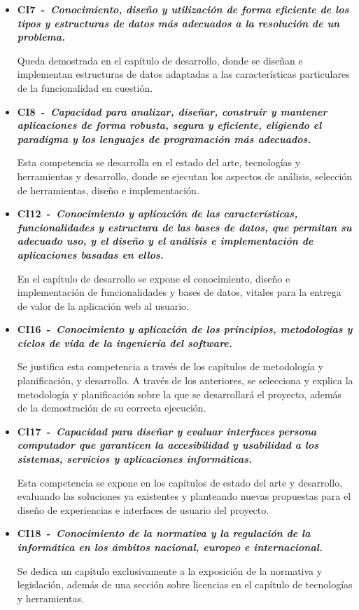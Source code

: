 \begin{itemize}
    Se cubre esta competencia en el capítulo de desarrollo, específicamente en la construcción de un algoritmo que permite el cálculo de acordes.

    \item \textbf{CI7~-~\emph{Conocimiento, diseño y utilización de forma eficiente de los tipos y estructuras de datos más adecuados a la resolución de un problema.}}

    Queda demostrada en el capítulo de desarrollo, donde se diseñan e implementan estructuras de datos adaptadas a las características particulares de la funcionalidad en cuestión.

    \item \textbf{CI8~-~\emph{Capacidad para analizar, diseñar, construir y mantener aplicaciones de forma robusta, segura y eficiente, eligiendo el paradigma y los lenguajes de programación más adecuados.}}

    Esta competencia se desarrolla en el estado del arte, tecnologías y herramientas y desarrollo, donde se ejecutan los aspectos de análisis, selección de herramientas, diseño e implementación.

    \item \textbf{CI12~-~\emph{Conocimiento y aplicación de las características, funcionalidades y estructura de las bases de datos, que permitan su adecuado uso, y el diseño y el análisis e implementación de aplicaciones basadas en ellos.}}

    En el capítulo de desarrollo se expone el conocimiento, diseño e implementación de funcionalidades y bases de datos, vitales para la entrega de valor de la aplicación web al usuario.
    
    \item \textbf{CI16~-~\emph{Conocimiento y aplicación de los principios, metodologías y ciclos de vida de la ingeniería del software.}}

    Se justifica esta competencia a través de los capítulos de metodología y planificación, y desarrollo. A través de los anteriores, se selecciona y explica la metodología y planificación sobre la que se desarrollará el proyecto, además de la demostración de su correcta ejecución.
    
    \item \textbf{CI17~-~\emph{Capacidad para diseñar y evaluar interfaces persona computador que garanticen la accesibilidad y usabilidad a los sistemas, servicios y aplicaciones informáticas.}}

    Esta competencia se expone en los capítulos de estado del arte y desarrollo, evaluando las soluciones ya existentes y planteando nuevas propuestas para el diseño de experiencias e interfaces de usuario del proyecto.

    \item \textbf{CI18~-~\emph{Conocimiento de la normativa y la regulación de la informática en los ámbitos nacional, europeo e internacional.}}

    Se dedica un capítulo exclusivamente a la exposición de la normativa y legislación, además de una sección sobre licencias en el capítulo de tecnologías y herramientas.
    
\end{itemize}

